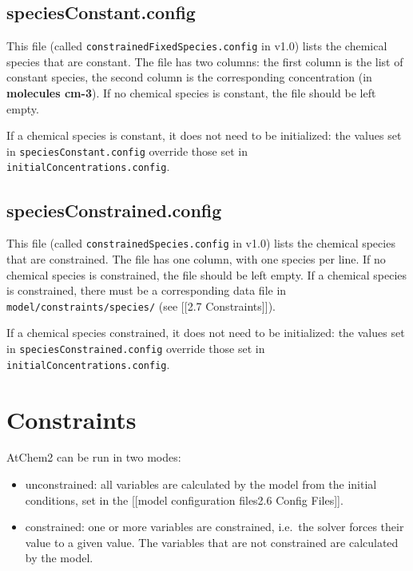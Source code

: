 \subsection{speciesConstant.config} \label{speciesconstant.config}

This file (called \texttt{constrainedFixedSpecies.config} in v1.0) lists
the chemical species that are constant. The file has two columns: the
first column is the list of constant species, the second column is the
corresponding concentration (in \textbf{molecules cm-3}). If no chemical
species is constant, the file should be left empty.

If a chemical species is constant, it does not need to be initialized:
the values set in \texttt{speciesConstant.config} override those set in
\texttt{initialConcentrations.config}.

\subsection{speciesConstrained.config} \label{speciesconstrained.config}

This file (called \texttt{constrainedSpecies.config} in v1.0) lists the
chemical species that are constrained. The file has one column, with one
species per line. If no chemical species is constrained, the file should
be left empty. If a chemical species is constrained, there must be a
corresponding data file in \texttt{model/constraints/species/} (see
{[}{[}2.7 Constraints{]}{]}).

If a chemical species constrained, it does not need to be initialized:
the values set in \texttt{speciesConstrained.config} override those set
in \texttt{initialConcentrations.config}.

\section{Constraints} \label{sec:constraints}

AtChem2 can be run in two modes:

\begin{itemize}
\item
  unconstrained: all variables are calculated by the model from the
  initial conditions, set in the {[}{[}model configuration
  files\textbar{}2.6 Config Files{]}{]}.
\item
  constrained: one or more variables are constrained, i.e.~the solver
  forces their value to a given value. The variables that are not
  constrained are calculated by the model.
\end{itemize}

